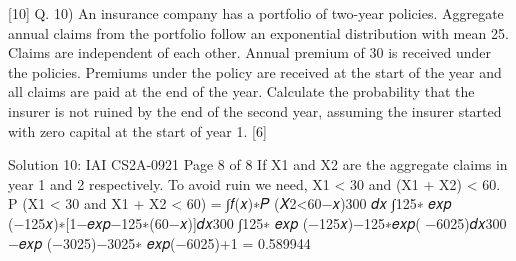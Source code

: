 [10]
Q. 10) An insurance company has a portfolio of two-year policies. Aggregate annual claims from
the portfolio follow an exponential distribution with mean 25. Claims are independent of
each other. Annual premium of 30 is received under the policies. Premiums under the
policy are received at the start of the year and all claims are paid at the end of the year.
Calculate the probability that the insurer is not ruined by the end of the second year,
assuming the insurer started with zero capital at the start of year 1. [6]


Solution 10:
IAI CS2A-0921
Page 8 of 8
If X1 and X2 are the aggregate claims in year 1 and 2 respectively.
To avoid ruin we need, X1 < 30 and (X1 + X2) < 60.
P (X1 < 30 and X1 + X2 < 60) = ∫𝑓(𝑥)∗𝑃 (𝑋2<60−𝑥)300 𝑑𝑥
∫125∗ 𝑒𝑥𝑝 (−125𝑥)∗[1−𝑒𝑥𝑝{−125∗(60−𝑥)}]𝑑𝑥300
∫125∗ 𝑒𝑥𝑝 (−125𝑥)−125∗𝑒𝑥𝑝( −6025)𝑑𝑥300
−𝑒𝑥𝑝 (−3025)−3025∗ 𝑒𝑥𝑝(−6025)+1
= 0.589944
